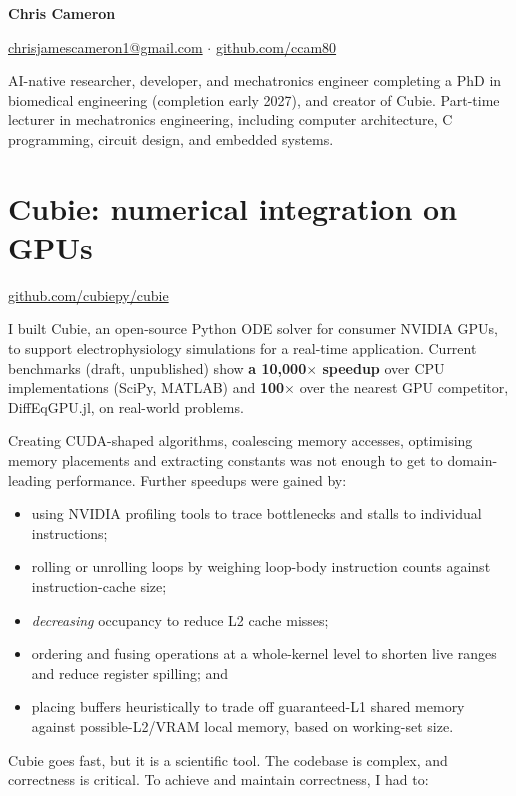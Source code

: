 \documentclass[11pt,a4paper]{article}
\begin{document}
{\fontsize{28}{32}\selectfont\bfseries Chris Cameron\par}
\vspace{2pt}
\href{mailto:chrisjamescameron1@gmail.com}{chrisjamescameron1@gmail.com}
\enspace$\cdot$\enspace
\href{https://github.com/ccam80}{github.com/ccam80}

\vspace{8pt}
AI-native researcher, developer, and mechatronics engineer completing a PhD in biomedical engineering
(completion early 2027), and creator of Cubie.
Part-time lecturer in mechatronics engineering, including computer architecture, C programming,
circuit design, and embedded systems.

\section{Cubie: numerical integration on GPUs}
{\small\color{muted}\href{https://github.com/cubiepy/cubie}{github.com/cubiepy/cubie}\par}
I built Cubie, an open-source Python ODE solver for consumer NVIDIA GPUs, to support
electrophysiology simulations for a real-time application. Current benchmarks
(draft, unpublished) show \textbf{a 10,000$\times$ speedup}
over CPU implementations (SciPy, MATLAB) and \textbf{100$\times$}
over the nearest GPU competitor, DiffEqGPU.jl, on real-world problems.

Creating CUDA-shaped algorithms, coalescing memory accesses, optimising memory placements and 
extracting constants was not enough to get to domain-leading performance. Further speedups were gained by:

\begin{itemize}
  \item using NVIDIA profiling tools to trace bottlenecks and stalls
    to individual instructions;
  \item rolling or unrolling loops by weighing loop-body instruction counts against instruction-cache size;
  \item \emph{decreasing} occupancy to reduce L2 cache misses;
  \item ordering and fusing operations at a whole-kernel level to shorten live ranges and reduce register spilling; and
  \item placing buffers heuristically to trade off guaranteed-L1 shared memory
    against possible-L2/VRAM local memory, based on working-set size.
\end{itemize}

Cubie goes fast, but it is a scientific tool. The codebase is complex, and correctness is critical.
To achieve and maintain correctness, I had to:
\end{document}
